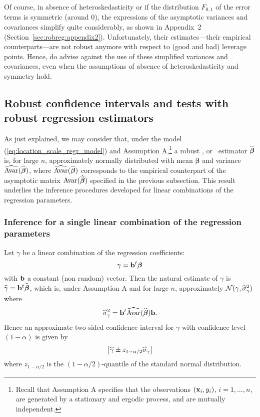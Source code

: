 Of course, in absence of heteroskedasticity or if the distribution $F_{0,1}$ of
the error terms is symmetric (around 0), the expressions of the asymptotic
variances and covariances simplify quite considerably, as shown in Appendix~2
(Section~\ref{sec:robreg:appendix2}). Unfortunately, their estimates---their
empirical counterparts---are not robust anymore with respect to (good and bad)
leverage points. Hence, \citet{Croux:2003} do advise against the use of these
simplified variances and covariances, even when the assumptions of absence of
heteroskedasticity and symmetry hold.

\subsection{Robust confidence intervals and tests with robust regression estimators}

As just explained, we may consider that, under the model
(\ref{eq:location_scale_regr_model}) and Assumption A,\footnote{Recall that
Assumption A specifies that the observations $(\mathbf x_i, y_i)$, $i = 1,
\dots, n$, are generated by a stationary and ergodic process, and are mutually
independent.} a robust ,  or ~estimator
$\widehat{\boldsymbol\beta}$ is, for large $n$, approximately normally
distributed with mean $\boldsymbol\beta$ and variance
$\widehat{\mathrm{Avar}}(\widehat{\boldsymbol\beta})$, where
$\widehat{\mathrm{Avar}}(\widehat{\boldsymbol\beta})$ corresponds to the empirical
counterpart of the asymptotic matrix $\mathrm{Avar}(\widehat{\boldsymbol\beta})$
specified in the previous subsection. This result underlies the inference
procedures developed for linear combinations of the regression parameters.

\subsubsection{Inference for a single linear combination of the regression parameters}

Let $\gamma$ be a linear combination of the regression coefficients:
\[
    \gamma = \mathbf b^t \boldsymbol\beta
\]
with $\mathbf b$ a constant (non random) vector. Then the natural estimate of
$\gamma$ is $\widehat{\gamma} = \mathbf b^t\widehat{\boldsymbol\beta}$, which is,
under Assumption A and for large $n$, approximately $\mathcal{N}(\gamma,
\widehat{\sigma}_\gamma^2)$ where
\[
    \widehat{\sigma}_\gamma^2 = 
    \mathbf b^t \widehat{\mathrm{Avar}}(\widehat{\boldsymbol\beta}) \mathbf b.
\]
Hence an approximate two-sided confidence interval for $\gamma$ with
confidence level $(1- \alpha)$ is given by
\[
    \left[\sthat{\gamma} \pm z_{1-\alpha/2} \sthat{\sigma}_\gamma\right]
\]
where $z_{1-\alpha/2}$ is the $(1-\alpha/2)$-quantile of the standard normal 
distribution.

